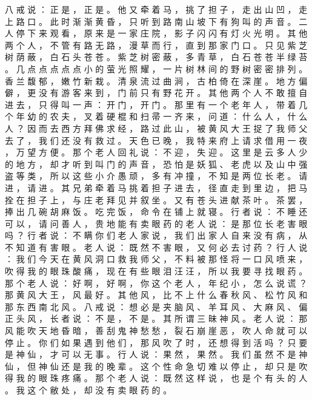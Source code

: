 {八 戒 说 ： 正 是 ， 正 是 。
他 又 牵 着 马 ， 挑 了 担 子 ， 走 出 山 凹 ， 走 上 路 口 。
此 时 渐 渐 黄 昏 ， 只 听 到 路 南 山 坡 下 有 狗 叫 的 声 音 。
二 人 停 下 来 观 看 ， 原 来 是 一 家 庄 院 ， 影 子 闪 闪 有 灯 火 光 明 。
其 他 两 个 人 ， 不 管 有 路 无 路 ， 漫 草 而 行 ， 直 到 那 家 门 口 。
只 见 紫 芝 树 荫 蔽 ， 白 石 头 苍 苍 。
紫 芝 树 密 蔽 ， 多 青 草 ， 白 石 苍 苍 半 绿 苔 。
几 点 点 点 点 点 小 的 萤 光 照 耀 ， 一 片 树 林 间 的 野 树 密 密 排 列 。
香 兰 馥 郁 ， 嫩 竹 新 栽 。
清 泉 流 过 曲 涧 ， 古 柏 倚 在 深 崖 。
地 方 偏 僻 ， 更 没 有 游 客 来 到 ， 门 前 只 有 野 花 开 。
其 他 两 个 人 不 敢 擅 自 进 去 ， 只 得 叫 一 声 ： 开 门 ， 开 门 。 那 里 有 一 个 老 年 人 ， 带 着 几 个 年 幼 的 农 夫 ， 叉 着 硬 棍 和 扫 帚 一 齐 来 ， 问 道 ： 什 么 人 ， 什 么 人 ？
因 而 去 西 方 拜 佛 求 经 ， 路 过 此 山 ， 被 黄 风 大 王 捉 了 我 师 父 去 了 ， 我 们 还 没 有 救 过 。
天 色 已 晚 ， 我 特 来 府 上 请 求 借 用 一 夜 ， 万 望 方 便 。
那 个 老 人 回 礼 说 ： 不 迎 ， 失 迎 。
这 里 是 云 多 人 少 的 地 方 ， 却 才 听 到 叫 门 的 声 音 ， 恐 怕 是 妖 狐 、 老 虎 以 及 山 中 强 盗 等 类 ， 所 以 这 些 小 介 愚 顽 ， 多 有 冲 撞 ， 不 知 是 两 位 长 老 。
请 进 ， 请 进 。
其 兄 弟 牵 着 马 挑 着 担 子 进 去 ， 径 直 走 到 里 边 ， 把 马 拴 在 担 子 上 ， 与 庄 老 拜 见 并 叙 坐 。
又 有 苍 头 进 献 茶 叶 。
茶 罢 ， 捧 出 几 碗 胡 麻 饭 。
吃 完 饭 ， 命 令 在 铺 上 就 寝 。
行 者 说 ： 不 睡 还 可 以 ， 请 问 善 人 ， 贵 地 能 有 卖 眼 药 的 老 人 说 ： 是 那 位 长 老 害 眼 吗 ？ 行 者 说 ： 不 瞒 你 们 老 人 家 说 ， 我 们 出 家 人 自 来 没 有 病 ， 从 不 知 道 有 害 眼 。
老 人 说 ： 既 然 不 害 眼 ， 又 何 必 去 讨 药 ？ 行 人 说 ： 我 们 今 天 在 黄 风 洞 口 救 我 师 父 ， 不 料 被 那 怪 将 一 口 风 喷 来 ， 吹 得 我 的 眼 珠 酸 痛 ， 现 在 有 些 眼 泪 汪 汪 ， 所 以 我 要 寻 找 眼 药 。
那 个 老 人 说 ： 好 啊 ， 好 啊 ， 你 这 个 老 人 ， 年 纪 小 ， 怎 么 说 谎 ？ 那 黄 风 大 王 ， 风 最 好 。
其 他 风 ， 比 不 上 什 么 春 秋 风 、 松 竹 风 和 那 东 西 南 北 风 。
八 戒 说 ： 想 必 是 夹 脑 风 、 羊 耳 风 、 大 麻 风 、 偏 正 头 风 ， 长 者 说 ： 不 是 ， 不 是 。
其 所 谓 三 昧 神 风 。
老 人 说 ： 那 风 能 吹 天 地 昏 暗 ， 善 刮 鬼 神 愁 愁 ， 裂 石 崩 崖 恶 ， 吹 人 命 就 可 以 停 止 。
你 们 如 果 遇 到 他 们 ， 那 风 吹 了 时 ， 还 想 得 到 活 吗 ？ 只 要 是 神 仙 ， 才 可 以 无 事 。
行 人 说 ： 果 然 ， 果 然 。
我 们 虽 然 不 是 神 仙 ， 但 神 仙 还 是 我 的 晚 辈 。
这 个 性 命 急 切 难 以 停 止 ， 却 只 是 吹 得 我 的 眼 珠 疼 痛 。
那 个 老 人 说 ： 既 然 这 样 说 ， 也 是 个 有 头 的 人 。
我 这 个 敝 处 ， 却 没 有 卖 眼 药 的 。
}
